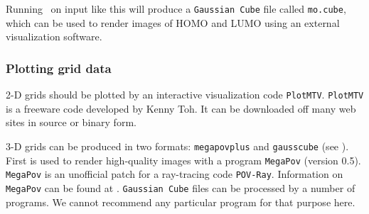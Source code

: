 Running \PSIthree\ on input like this will produce a {\tt Gaussian Cube}
file called {\tt mo.cube}, which can be used to render images of HOMO
and LUMO using
an external visualization software.

\subsubsection{Plotting grid data}
2-D grids should be plotted by an interactive visualization
code {\tt PlotMTV}. {\tt PlotMTV} is a freeware code
developed by Kenny Toh. It can be downloaded off many web sites in
source or binary form.

3-D grids can be produced in two formats: {\tt megapovplus}  and {\tt gausscube}
(see ).
First is used to render high-quality images with a program {\tt MegaPov} (version
0.5).  {\tt MegaPov} is an unofficial patch for a ray-tracing code
{\tt POV-Ray}. Information on {\tt MegaPov} can be found at
.
{\tt Gaussian Cube} files can be processed by a number of programs. We cannot recommend
any particular program for that purpose here.


